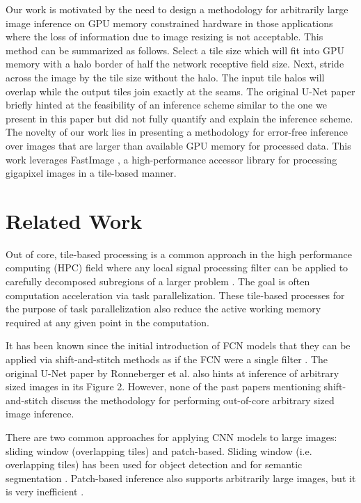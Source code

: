 \documentclass[runningheads]{llncs}
\begin{document}
Our work is motivated by the need to design a methodology for arbitrarily large image inference on GPU memory constrained hardware in those applications where the loss of information due to image resizing is not acceptable. This method can be summarized as follows. Select a tile size which will fit into GPU memory with a halo border of half the network receptive field size. Next, stride across the image by the tile size without the halo. The input tile halos will overlap while the output tiles join exactly at the seams. 
The original U-Net paper \cite{Ronneberger2015a} briefly hinted at the feasibility of an inference scheme similar to the one we present in this paper but did not fully quantify and explain the inference scheme. 
The novelty of our work lies in presenting a methodology for error-free inference over images that are larger than available GPU memory for processed data. This work leverages FastImage \cite{Bardakoff2019}, a high-performance accessor library for processing gigapixel images in a tile-based manner.

\section{Related Work}
\label{related-work}

Out of core, tile-based processing is a common approach in the high performance computing (HPC) field where any local signal processing filter can be applied to carefully decomposed subregions of a larger problem \cite{Blattner2017}. The goal is often computation acceleration via task parallelization. These tile-based processes for the purpose of task parallelization also reduce the active working memory required at any given point in the computation.

It has been known since the initial introduction of FCN models that they can be applied via shift-and-stitch methods as if the FCN were a single filter \cite{Long2015,Sherrah2016}.
The original U-Net paper by Ronneberger et al. \cite{Ronneberger2015a} also hints at inference of arbitrary sized images in its Figure 2. However, none of the past papers mentioning shift-and-stitch discuss the methodology for performing out-of-core arbitrary sized image inference.

There are two common approaches for applying CNN models to large images: sliding window (overlapping tiles) and patch-based. Sliding window (i.e. overlapping tiles) has been used for object detection \cite{Sermanet2013,VanEtten2019} and for semantic segmentation \cite{Lin2019,Volpi2017a}. Patch-based inference also supports arbitrarily large images, but it is very inefficient \cite{Volpi2017a,Maggiori2016}.
\end{document}
